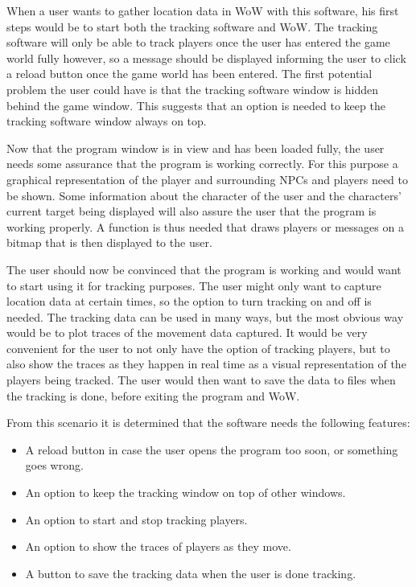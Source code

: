 When a user wants to gather location data in WoW with this software, his first steps would be to start both the tracking software and WoW. The tracking software will only be able to track players once the user has entered the game world fully however, so a message should be displayed informing the user to click a reload button once the game world has been entered. The first potential problem the user could have is that the tracking software window is hidden behind the game window. This suggests that an option is needed to keep the tracking software window always on top.

Now that the program window is in view and has been loaded fully, the user needs some assurance that the program is working correctly. For this purpose a graphical representation of the player and surrounding NPCs and players need to be shown. Some information about the character of the user and the characters' current target being displayed will also assure the user that the program is working properly. A function is thus needed that draws players or messages on a bitmap that is then displayed to the user.

The user should now be convinced that the program is working and would want to start using it for tracking purposes. The user might only want to capture location data at certain times, so the option to turn tracking on and off is needed. The tracking data can be used in many ways, but the most obvious way would be to plot traces of the movement data captured. It would be very convenient for the user to not only have the option of tracking players, but to also show the traces as they happen in real time as a visual representation of the players being tracked. The user would then want to save the data to files when the tracking is done, before exiting the program and WoW.

From this scenario it is determined that the software needs the following features:

\begin{itemize}
	\item A reload button in case the user opens the program too soon, or something goes wrong.
	\item An option to keep the tracking window on top of other windows.
	\item An option to start and stop tracking players.
	\item An option to show the traces of players as they move.
	\item A button to save the tracking data when the user is done tracking.
\end{itemize}

